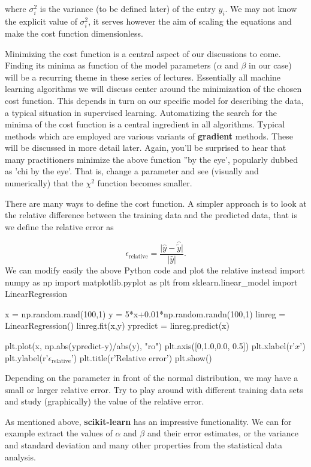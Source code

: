 \documentclass[%
oneside,                 %
final,                   %
10pt]{article}
\begin{document}
where $\sigma_i^2$ is the variance (to be defined later) of the entry
$y_i$.  We may not know the explicit value of $\sigma_i^2$, it serves
however the aim of scaling the equations and make the cost function
dimensionless.  

Minimizing the cost function is a central aspect of
our discussions to come. Finding its minima as function of the model
parameters ($\alpha$ and $\beta$ in our case) will be a recurring
theme in these series of lectures. Essentially all machine learning
algorithms we will discuss center around the minimization of the
chosen cost function. This depends in turn on our specific
model for describing the data, a typical situation in supervised
learning. Automatizing the search for the minima of the cost function is a
central ingredient in all algorithms. Typical methods which are
employed are various variants of \textbf{gradient} methods. These will be
discussed in more detail later. Again, you'll be surprised to hear that
many practitioners minimize the above function ''by the eye', popularly dubbed as 
'chi by the eye'. That is, change a parameter and see (visually and numerically) that 
the  $\chi^2$ function becomes smaller. 

There are many ways to define the cost function. A simpler approach is to look at the relative difference between the training data and the predicted data, that is we define 
the relative error as

\[
\epsilon_{\mathrm{relative}}= \frac{\vert \hat{y} -\hat{\tilde{y}}\vert}{\vert \hat{y}\vert}.
\]
We can modify easily the above Python code and plot the relative instead
\bpycod
import numpy as np
import matplotlib.pyplot as plt
from sklearn.linear_model import LinearRegression

x = np.random.rand(100,1)
y = 5*x+0.01*np.random.randn(100,1)
linreg = LinearRegression()
linreg.fit(x,y)
ypredict = linreg.predict(x)

plt.plot(x, np.abs(ypredict-y)/abs(y), "ro")
plt.axis([0,1.0,0.0, 0.5])
plt.xlabel(r'$x$')
plt.ylabel(r'$\epsilon_{\mathrm{relative}}$')
plt.title(r'Relative error')
plt.show()
\epycod

Depending on the parameter in front of the normal distribution, we may
have a small or larger relative error. Try to play around with
different training data sets and study (graphically) the value of the
relative error.

As mentioned above, \textbf{scikit-learn} has an impressive functionality.
We can for example extract the values of $\alpha$ and $\beta$ and
their error estimates, or the variance and standard deviation and many
other properties from the statistical data analysis. 
\end{document}
